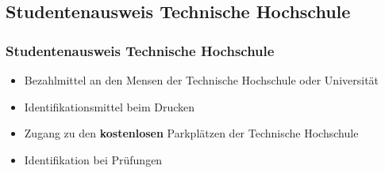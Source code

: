 \documentclass[10pt,a4paper]{beamer}
\begin{document}
\subsection*{Studentenausweis Technische Hochschule}
\begin{frame}
\frametitle{Studentenausweis Technische Hochschule}
\begin{itemize}
	\setlength{\itemsep}{10pt} %
	\item Bezahlmittel an den Mensen der Technische Hochschule oder Universität
	\item Identifikationsmittel beim Drucken %
	\item Zugang zu den \textbf{kostenlosen} Parkplätzen der Technische Hochschule
	\item Identifikation bei Prüfungen
\end{itemize}
\end{frame}

\end{document}
